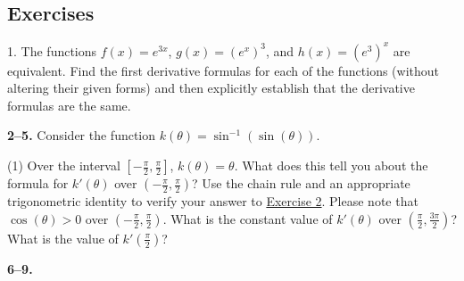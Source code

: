 \documentclass[10pt,oneside,]{book}
\newcommand{\gt}{>}
\theoremstyle{plain}
\theoremstyle{definition}
\numberwithin{equation}{section}
\newcounter{figstack}
\newcounter{figindex}
\newlength\fight
\newcommand\pushValignCaptionBottom[5][b]{%
\stepcounter{figstack}%
\expandafter\def\csname %
figalign\romannumeral\value{figstack}\endcsname{#1}%
\expandafter\def\csname %
figtype\romannumeral\value{figstack}\endcsname{#2}%
\expandafter\def\csname %
figwd\romannumeral\value{figstack}\endcsname{#3}%
\expandafter\def\csname %
figcontent\romannumeral\value{figstack}\endcsname{#4}%
\expandafter\def\csname %
figcap\romannumeral\value{figstack}\endcsname{#5}%
\setbox0=\hbox{%
\begin{#2}{#3}#4\end{#2}}%
\ifdim\dimexpr\ht0+\dp0\relax>\fight\global\setlength{\fight}{%
\dimexpr\ht0+\dp0\relax}\fi%
}
\newcommand\popValignCaptionBottom{%
\setcounter{figindex}{0}%
\hfill%
\whiledo{\value{figindex}<\value{figstack}}{%
\stepcounter{figindex}%
\def\tmp{\csname figwd\romannumeral\value{figindex}\endcsname}%
\begin{\csname figtype\romannumeral\value{figindex}\endcsname}[t]{\tmp}%
\centering%
\stackinset{c}{}%
{\csname figalign\romannumeral\value{figindex}\endcsname}{}%
{\csname figcontent\romannumeral\value{figindex}\endcsname}%
{\rule{0pt}{\fight}}\par%
\csname figcap\romannumeral\value{figindex}\endcsname%
\end{\csname figtype\romannumeral\value{figindex}\endcsname}%
\hfill%
}%
\setcounter{figstack}{0}%
\setlength{\fight}{0pt}%
\hfill%
}
\newcommand{\fe}[2]{#1\mathopen{}\left(#2\right)\mathclose{}}
\newcommand{\cinterval}[2]{\left[#1,#2\right]}
\newcommand{\ointerval}[2]{\left(#1,#2\right)}
\newcommand{\fd}[1]{#1'}
\begin{document}
\subsection[Exercises]{Exercises}\label{exercises-47}
\begin{exerciselist}
\item[1.]\hypertarget{exercise-483}{\null}The functions \(\fe{f}{x}=e^{3x}\), \(\fe{g}{x}=\left(e^x\right)^3\), and \(\fe{h}{x}=\left(e^3\right)^x\) are equivalent.  Find the first derivative formulas for each of the functions (without altering their given forms) and then explicitly establish that the derivative formulas are the same.%
\par\smallskip
\end{exerciselist}
\textbf{2--5. }\hypertarget{exercisegroup-100}{\null}Consider the function \(\fe{k}{\theta}=\fe{\sin^{-1}}{\fe{\sin}{\theta}}\).%
\par
\begin{exercisegroup}(1)
\exercise[2.]\hypertarget{exercise-trivial-chain-rule}{\null}Over the interval \(\cinterval{-\frac{\pi}{2}}{\frac{\pi}{2}}\), \(\fe{k}{\theta}=\theta\).  What does this tell you about the formula for \(\fe{\fd{k}}{\theta}\) over \(\ointerval{-\frac{\pi}{2}}{\frac{\pi}{2}}\)?%
\exercise[3.]\hypertarget{exercise-485}{\null}Use the chain rule and an appropriate trigonometric identity to verify your answer to \hyperlink{exercise-trivial-chain-rule}{Exercise 2}.  Please note that \(\fe{\cos}{\theta}\gt0\) over  \(\ointerval{-\frac{\pi}{2}}{\frac{\pi}{2}}\).%
\exercise[4.]\hypertarget{exercise-486}{\null}What is the constant value of \(\fe{\fd{k}}{\theta}\) over \(\ointerval{\frac{\pi}{2}}{\frac{3\pi}{2}}\)?%
\exercise[5.]\hypertarget{exercise-487}{\null}What is the value of \(\fe{\fd{k}}{\frac{\pi}{2}}\)?%
\end{exercisegroup}
\par\smallskip\noindent
\textbf{6--9. }\hypertarget{exercisegroup-101}{\null}
\end{document}
